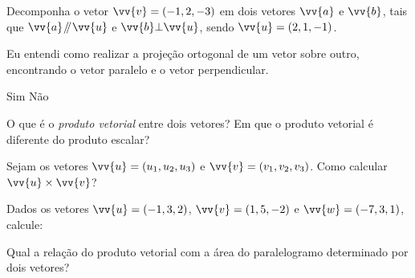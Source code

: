 \documentclass[pdftex, brazil, 12pt, oneside, addpoints]{exam}
\newcommand{\duaslinhas}{\fillwithlines{0.50in}}
\newcommand{\cincolinhas}{\fillwithlines{1.25in}}
\newcommand{\vetor}[1]{\ensuremath{\vv{#1}}}
\newcommand{\paralelo}{\mathbin{\!/\mkern-5mu/\!}}
\begin{document}
\begin{questions}
\question
Decomponha o vetor $\vetor{v} = (-1, 2, -3)$ em dois vetores \vetor{a}
e \vetor{b}, tais que $\vetor{a} \paralelo \vetor{u}$ e $\vetor{b} \bot
\vetor{u}$, sendo $\vetor{u} = (2, 1, -1)$.

\question
Eu entendi como realizar a projeção ortogonal de um vetor sobre outro,
encontrando o vetor paralelo e o vetor perpendicular.
\begin{checkboxes}
  \choice Sim
  \choice Não
\end{checkboxes}



\question
O que é o \emph{produto vetorial} entre dois vetores? Em que o produto
vetorial é diferente do produto escalar?
\cincolinhas

\question
Sejam os vetores $\vetor{u} = (u_1, u_2, u_3)$ e $\vetor{v} = (v_1,
v_2, v_3)$. Como calcular $\vetor{u} \times \vetor{v}$?

\question
Dados os vetores $\vetor{u} = (-1, 3, 2)$, $\vetor{v} = (1, 5, -2)$ e
$\vetor{w} = (-7, 3, 1)$, calcule:

\question
Qual a relação do produto vetorial com a área do paralelogramo
determinado por dois vetores?
\duaslinhas


\end{questions}
\end{document}
